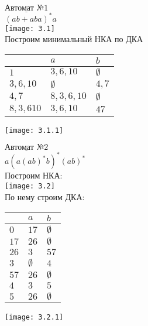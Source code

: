 \documentclass[14pt]{extreport}
\begin{document}
$\underline{\text{Автомат №1}}$\\
$(ab+aba)^* a$\\
\texttt{[image: 3.1]}\\

Построим минимальный НКА по ДКА\\

\begin{table}[h!]
	\centering
    \begin{tabular}{l | l | l |}
    \hline
     & $a$ & $b$ \\ \hline
    $1$ & $3,6,10$ & $\emptyset$ \\ \hline
    $3,6,10$ & $\emptyset$ & $4,7$ \\ \hline
    $4,7$ & $8,3,6,10$ & $\emptyset$ \\ \hline
    $8,3,610$ & $3,6,10$ & $47$ \\
    \hline
    \end{tabular}
\end{table}

\texttt{[image: 3.1.1]}

$\underline{\text{Автомат №2}}$\\
$a(a(ab)^*b)^*(ab)^*$\\

Построим НКА:\\

\texttt{[image: 3.2]}\\

По нему строим ДКА:\\

\begin{table}[h!]
	\centering
    \begin{tabular}{l | l | l |}
    \hline
     & $a$ & $b$ \\ \hline
    $0$ & $17$ & $\emptyset$ \\ \hline
    $17$ & $26$ & $\emptyset$ \\ \hline
    $26$ & $3$ & $57$ \\ \hline
    $3$ & $\emptyset$ & $4$ \\ \hline
    $57$ & $26$ & $\emptyset$ \\ \hline
    $4$ & $3$ & $5$ \\ \hline
    $5$ & $26$ & $\emptyset$ \\ 
    \hline
    \end{tabular}
\end{table}

\texttt{[image: 3.2.1]}
\end{document}

